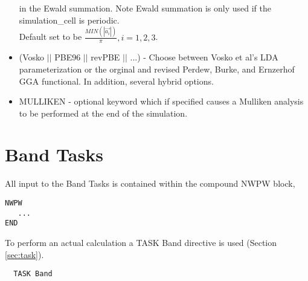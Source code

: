 \begin{itemize}
                          in the Ewald summation.  Note Ewald summation
                          is only used if the simulation\_cell is periodic. \\
                          Default set to be
                          $\frac{MIN(\left| \vec{a_i} \right|)}{\pi}, i=1,2,3$.
        \item (Vosko $||$ PBE96 $||$ revPBE $||$ ...) - Choose between Vosko et al's LDA 
                               parameterization or the orginal and revised Perdew, Burke, 
                               and Ernzerhof GGA functional.  In addition, several hybrid options.
        \item MULLIKEN - optional keyword which if specified
                         causes a Mulliken analysis to be performed at
                         the end of the simulation.  
\end{itemize}





\section{Band Tasks}
\label{sec:band_tasks}

All input to the Band Tasks is contained within the compound NWPW block,
\begin{verbatim}
NWPW
   ...
END
\end{verbatim}

To perform an actual calculation a TASK Band directive is used (Section \ref{sec:task}).  
\begin{verbatim}
  TASK Band
\end{verbatim} 

